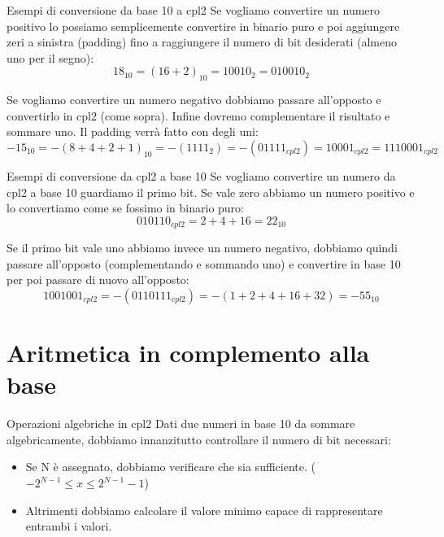 \documentclass[aspectratio=169, ]{beamer}
\begin{document}
\begin{frame}{Esempi di conversione da base 10 a cpl2}
Se vogliamo convertire un numero positivo lo possiamo semplicemente convertire in binario puro e poi aggiungere zeri a sinistra (padding) fino a raggiungere il numero di bit desiderati (almeno uno per il segno):
\[ 18_{10} = (16+2)_{10} = 10010_2 = 010010_2 \]

\pause
Se vogliamo convertire un numero negativo dobbiamo passare all'opposto e convertirlo in cpl2 (come sopra).
Infine dovremo complementare il risultato e sommare uno.
Il padding verrà fatto con degli uni:
\[ -15_{10} = -(8+4+2+1)_{10} = -(1111_2) = -(01111_{cpl2}) = 10001_{cpl2} = 1110001_{cpl2} \]
\end{frame}

\begin{frame}{Esempi di conversione da cpl2 a base 10}
Se vogliamo convertire un numero da cpl2 a base 10 guardiamo il primo bit.
Se vale zero abbiamo un numero positivo e lo convertiamo come se fossimo in binario puro:
\[ 010110_{cpl2} = 2+4+16 = 22_{10} \]

\pause
Se il primo bit vale uno abbiamo invece un numero negativo, dobbiamo quindi passare all'opposto (complementando e sommando uno) e convertire in base 10 per poi passare di nuovo all'opposto:
\[1001001_{cpl2} = -(0110111_{cpl2}) = -(1+2+4+16+32) = -55_{10}\]
\end{frame}

\section{Aritmetica in complemento alla base}

\begin{frame}{Operazioni algebriche in cpl2}
Dati due numeri in base 10 da sommare algebricamente, dobbiamo innanzitutto controllare il numero di bit necessari:
\begin{itemize}
\item Se N è assegnato, dobbiamo verificare che sia sufficiente. ($-2^{N-1} \leq x \leq 2^{N-1}-1$)
\item Altrimenti dobbiamo calcolare il valore minimo capace di rappresentare \alert{entrambi} i valori.
\end{itemize}
\end{frame}
\end{document}
